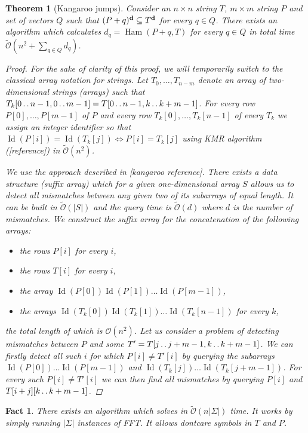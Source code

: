 \documentclass[11pt]{article}
\DeclareMathOperator*{\Ham}{Ham}
\DeclareMathOperator*{\ID}{Id}
\def\dd{\mathinner{.\,.}}
\renewcommand{\O}{\mathcal{O}}
\newcommand{\tO}{\tilde{\mathcal{O}}}
\theoremstyle{plain}
\newtheorem{theorem}{Theorem}
\newtheorem{fact}{Fact}
\theoremstyle{definition}
\theoremstyle{remark}
\begin{document}
\begin{theorem}[Kangaroo jumps]\label{kangaroos}
	Consider an $n \times n$ string $T$, $m \times m$ string $P$ and set of vectors $Q$ such that $(P + q)^\mathbf{d} \subseteq T^\mathbf{d}$ for every $q \in Q$.
	There exists an algorithm which calculates $ d_q = \Ham(P + q, T) $ for every $q \in Q$ in total time $\tO(n^2 + \sum_{q \in Q} d_q)$.
	\begin{proof}
		For the sake of clarity of this proof, we will temporarily switch to the classical array notation for strings.
		Let $T_0, \dots, T_{n - m}$ denote an array of two-dimensional strings (arrays) such that $T_k[0 \dd n - 1, 0 \dd m - 1] = T[0 \dd n - 1, k \dd k + m - 1]$.
		For every row $P[0], \dots, P[m - 1]$ of $P$ and every row $T_k[0], \dots, T_k[n - 1]$ of every $T_k$ we assign an integer identifier so that $\ID(P[i]) = \ID(T_k[j]) \Leftrightarrow P[i] = T_k[j]$ using KMR algorithm ([reference]) in $\tO(n^2)$.
		
		We use the approach described in [kangaroo reference].
		There exists a data structure (suffix array) which for a given one-dimensional array $S$ allows us to detect all mismatches between any given two of its subarrays of equal length.
		It can be built in $\tO(|S|)$ and the query time is $\tO(d)$ where $d$ is the number of mismatches.
		We construct the suffix array for the concatenation of the following arrays:
		\begin{itemize}
			\item the rows $P[i]$ for every $i$,
			\item the rows $T[i]$ for every $i$,
			\item the array $\ID(P[0]) \ID(P[1]) \dots \ID(P[m - 1])$,
			\item the arrays $\ID(T_k[0]) \ID(T_k[1]) \dots \ID(T_k[n - 1])$ for every $k$,
		\end{itemize}
		the total length of which is $\O(n^2)$.
		Let us consider a problem of detecting mismatches between $P$ and some $T' = T[j \dd j + m - 1, k \dd k + m - 1]$.
		We can firstly detect all such $i$ for which $P[i] \neq T'[i]$ by querying the subarrays $\ID(P[0]) \dots \ID(P[m - 1])$ and $\ID(T_k[j]) \dots \ID(T_k[j + m - 1])$.
		For every such $P[i] \neq T'[i]$ we can then find all mismatches by querying $P[i]$ and $T[i + j][k \dd k + m - 1]$.
	\end{proof}
\end{theorem}


\begin{fact}\label{sigman1d}
	There exists an algorithm which solves \hd in $\tO(n|\Sigma|)$ time.
	It works by simply running $|\Sigma|$ instances of FFT.
	It allows dontcare symbols in $T$ and $P$.
\end{fact}
\end{document}
